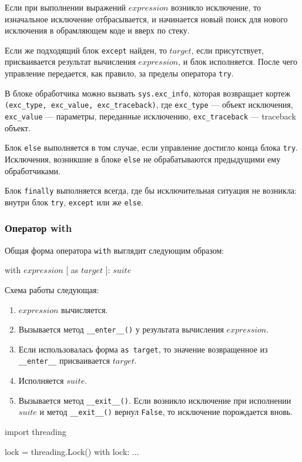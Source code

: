Если при выполнении выражений $expression$ возникло исключение, то изначальное исключение отбрасывается, и начинается новый поиск для нового исключения в обрамляющем коде и вверх по стеку.

Если же подходящий блок \lstinline{except} найден, то $target$, если присутствует, присваивается результат вычисления $expression$, и блок исполняется. После чего управление передается, как правило, за пределы оператора \lstinline{try}.

В блоке обработчика можно вызвать \lstinline{sys.exc_info}, которая возвращает кортеж \lstinline{(exc_type, exc_value, exc_traceback)}, где \lstinline{exc_type} --- объект исключения, \lstinline{exc_value} --- параметры, переданные исключению, \lstinline{exc_traceback} --- traceback объект.

Блок \lstinline{else} выполняется в том случае, если управление достигло конца блока \lstinline{try}. Исключения, возникшие в блоке \lstinline{else} не обрабатываются предыдущими ему обработчиками.

Блок \lstinline{finally} выполняется всегда, где бы исключительная ситуация не возникла: внутри блок \lstinline{try}, \lstinline{except} или же \lstinline{else}.

\subsubsection{Оператор with}
Общая форма оператора \lstinline{with} выглядит следующим образом:
\begin{pylst}{}{}
with $expression$ [ as $target$ ]: $suite$
\end{pylst}

Схема работы следующая:
\begin{enumerate}
  \item $expression$ вычисляется.
  \item Вызывается метод \lstinline{__enter__()} у результата вычисления $expression$.
  \item Если использовалась форма \lstinline{as target}, то значение возвращенное из \lstinline{__enter__} присваивается $target$.
  \item Исполняется $suite$.
  \item Вызывается метод \lstinline{__exit__()}. Если возникло исключение при исполнении $suite$ и метод \lstinline{__exit__()} вернул \lstinline{False}, то исключение порождается вновь.
\end{enumerate}

\begin{pylst}{}{}
import threading

lock = threading.Lock()
with lock: ...
\end{pylst}

